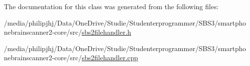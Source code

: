 The documentation for this class was generated from the following files\-:\begin{DoxyCompactItemize}
\item 
/media/philipjhj/\-Data/\-One\-Drive/\-Studie/\-Studenterprogrammør/\-S\-B\-S3/smartphonebrainscanner2-\/core/src/\hyperlink{sbs2filehandler_8h}{sbs2filehandler.\-h}\item 
/media/philipjhj/\-Data/\-One\-Drive/\-Studie/\-Studenterprogrammør/\-S\-B\-S3/smartphonebrainscanner2-\/core/src/\hyperlink{sbs2filehandler_8cpp}{sbs2filehandler.\-cpp}\end{DoxyCompactItemize}

